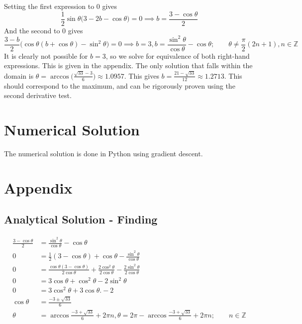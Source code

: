 \documentclass{article}
\begin{document}
Setting the first expression to 0 gives
$$ \frac{1}{2} \sin \theta \big(3 - 2b - \cos \theta) = 0 \implies b  = \frac{3 - \cos \theta}{2}$$
And the second to 0 gives 
$$ \frac{3-b}{2} \big( \cos \theta (b + \cos \theta ) - \sin^2 \theta \big) = 0 \implies b = 3, b = \frac{\sin^2 \theta }{\cos \theta} - \cos \theta; \qquad \theta \neq \frac{\pi}{2}(2n + 1) , n \in \mathbb{Z}$$
It is clearly not possible for $b = 3$, so we solve for equivalence of both right-hand expressions. This is given in the appendix. The only solution that falls within the domain is $\theta = \arccos \big(\frac{\sqrt{33} - 3}{6} \big) \approx 1.0957$. This gives $b = \frac{21 - \sqrt{33}}{12} \approx 1.27	13$. This should correspond to the maximum, and can be rigorously proven using the second derivative test.

\section*{Numerical Solution}
The numerical solution is done in Python using gradient descent. 

\section*{Appendix}
\subsection*{Analytical Solution - Finding \theta}
\begin{align*}
	\frac{3 - \cos \theta}{2} &= \frac{\sin^2 \theta }{\cos \theta} - \cos \theta \\
	0 &= \frac{1}{2}(3 - \cos \theta ) + \cos \theta  - \frac{\sin^2 \theta}{\cos \theta} \\
	0 &= \frac{\cos \theta (3- \cos \theta)}{2 \cos \theta} + \frac{2\cos^2 \theta }{2\cos \theta} - \frac{2 \sin^2 \theta}{2 \cos \theta }\\
	0 &= 3 \cos \theta + \cos^2 \theta - 2 \sin^2 \theta  \\
		0 &= 3 \cos^2 \theta + 3 \cos \theta. - 2 \\
	\cos\theta &= \frac{-3 \pm \sqrt{33}}{6} \\
	\theta &= \arccos \frac{-3 + \sqrt{33}}{6} + 2 \pi n, \theta = 2\pi - \arccos \frac{-3 + \sqrt{33}}{6} + 2 \pi n; \qquad n \in \mathbb{Z}
	\end{align*}
\end{document}
